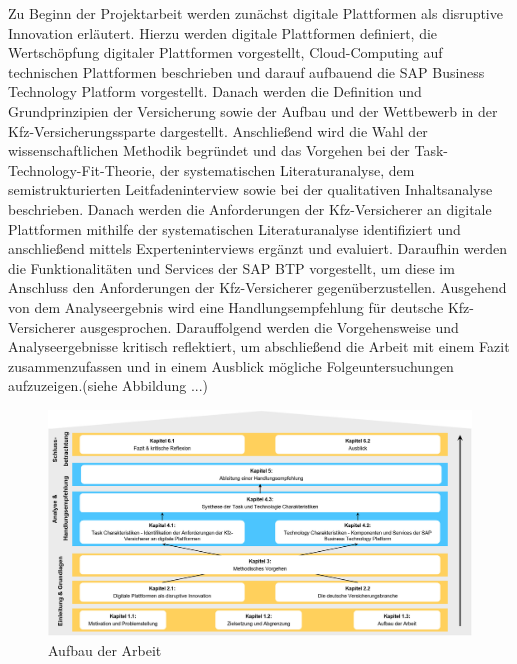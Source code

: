 Zu Beginn der Projektarbeit werden zunächst digitale Plattformen als disruptive Innovation erläutert. Hierzu werden digitale Plattformen definiert, die Wertschöpfung digitaler Plattformen vorgestellt, Cloud-Computing auf technischen Plattformen beschrieben und darauf aufbauend die SAP Business Technology Platform vorgestellt. Danach werden die Definition und Grundprinzipien der Versicherung sowie der Aufbau und der Wettbewerb in der Kfz-Versicherungssparte dargestellt. Anschließend wird die Wahl der wissenschaftlichen Methodik begründet und das Vorgehen bei der Task-Technology-Fit-Theorie, der systematischen Literaturanalyse, dem semistrukturierten Leitfadeninterview sowie bei der qualitativen Inhaltsanalyse beschrieben. Danach werden die Anforderungen der Kfz-Versicherer an digitale Plattformen mithilfe der systematischen Literaturanalyse identifiziert und anschließend mittels Experteninterviews ergänzt und evaluiert. Daraufhin werden die Funktionalitäten und Services der SAP BTP vorgestellt, um diese im Anschluss den Anforderungen der Kfz-Versicherer gegenüberzustellen. Ausgehend von dem Analyseergebnis wird eine Handlungsempfehlung für deutsche Kfz-Versicherer ausgesprochen. Darauffolgend werden die Vorgehensweise und Analyseergebnisse kritisch reflektiert, um abschließend die Arbeit mit einem Fazit zusammenzufassen und in einem Ausblick mögliche Folgeuntersuchungen aufzuzeigen.(siehe Abbildung ...)


\begin{figure}[h]
    \centering
    \includegraphics[width=1\textwidth]{img/Aufbau_der_Arbeit.jpg}
    \caption[Aufbau der Arbeit]{Aufbau der Arbeit\autocite{Aufbau}}
    \label{fig:Aufbau}
\end{figure}


\newpage